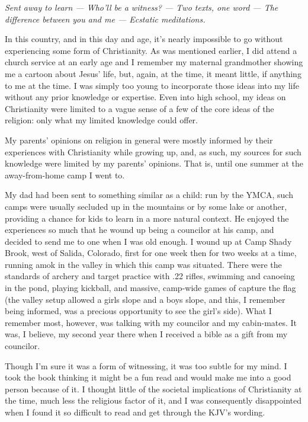 \emph{Sent away to learn --- Who'll be a witness? --- Two texts, one word --- The difference between you and me --- Ecstatic meditations.}

In this country, and in this day and age, it's nearly impossible to go without experiencing some form of Christianity. As was mentioned earlier, I did attend a church service at an early age and I remember my maternal grandmother showing me a cartoon about Jesus' life, but, again, at the time, it meant little, if anything to me at the time. I was simply too young to incorporate those ideas into my life without any prior knowledge or expertise. Even into high school, my ideas on Christianity were limited to a vague sense of a few of the core ideas of the religion: only what my limited knowledge could offer.

My parents' opinions on religion in general were mostly informed by their experiences with Christianity while growing up, and, as such, my sources for such knowledge were limited by my parents' opinions. That is, until one summer at the away-from-home camp I went to.

My dad had been sent to something similar as a child: run by the YMCA, such camps were usually secluded up in the mountains or by some lake or another, providing a chance for kids to learn in a more natural context. He enjoyed the experiences so much that he wound up being a councilor at his camp, and decided to send me to one when I was old enough. I wound up at Camp Shady Brook, west of Salida, Colorado, first for one week then for two weeks at a time, running amok in the valley in which this camp was situated. There were the standards of archery and target practice with .22 rifles, swimming and canoeing in the pond, playing kickball, and massive, camp-wide games of capture the flag (the valley setup allowed a girls slope and a boys slope, and this, I remember being informed, was a precious opportunity to see the girl's side). What I remember most, however, was talking with my councilor and my cabin-mates. It was, I believe, my second year there when I received a bible as a gift from my councilor.

Though I'm sure it was a form of witnessing, it was too subtle for my mind. I took the book thinking it might be a fun read and would make me into a good person because of it. I thought little of the societal implications of Christianity at the time, much less the religious factor of it, and I was consequently disappointed when I found it so difficult to read and get through the KJV's wording.

